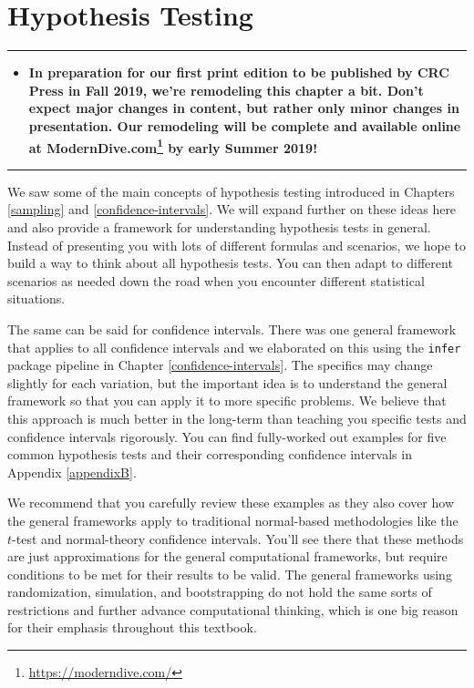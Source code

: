 \documentclass[12pt, krantz2,]{krantz}
\renewcommand{\href}[2]{#2\footnote{\url{#1}}}
\newenvironment{rmdblock}[1]
  {\begin{shaded*}
  \begin{itemize}
  \renewcommand{\labelitemi}{
    \raisebox{-.7\height}[0pt][0pt]{
    }
  }
  \item
  }
  {
  \end{itemize}
  \end{shaded*}
  }
\newenvironment{announcement}
  {\begin{rmdblock}{warning}}
  {\end{rmdblock}}
\begin{document}
\hypertarget{hypothesis-testing}{%
\chapter{Hypothesis Testing}\label{hypothesis-testing}}

\begin{center}\rule{0.5\linewidth}{\linethickness}\end{center}

\begin{announcement}
\textbf{In preparation for our first print edition to be published by
CRC Press in Fall 2019, we're remodeling this chapter a bit. Don't
expect major changes in content, but rather only minor changes in
presentation. Our remodeling will be complete and available online at
\href{https://moderndive.com/}{ModernDive.com} by early Summer 2019!}
\end{announcement}

\begin{center}\rule{0.5\linewidth}{\linethickness}\end{center}

We saw some of the main concepts of hypothesis testing introduced in Chapters \ref{sampling} and \ref{confidence-intervals}. We will expand further on these ideas here and also provide a framework for understanding hypothesis tests in general. Instead of presenting you with lots of different formulas and scenarios, we hope to build a way to think about all hypothesis tests. You can then adapt to different scenarios as needed down the road when you encounter different statistical situations.

The same can be said for confidence intervals. There was one general framework that applies to all confidence intervals and we elaborated on this using the \texttt{infer} package pipeline in Chapter \ref{confidence-intervals}. The specifics may change slightly for each variation, but the important idea is to understand the general framework so that you can apply it to more specific problems. We believe that this approach is much better in the long-term than teaching you specific tests and confidence intervals rigorously. You can find fully-worked out examples for five common hypothesis tests and their corresponding confidence intervals in Appendix \ref{appendixB}.

We recommend that you carefully review these examples as they also cover how the general frameworks apply to traditional normal-based methodologies like the \(t\)-test and normal-theory confidence intervals. You'll see there that these methods are just approximations for the general computational frameworks, but require conditions to be met for their results to be valid. The general frameworks using randomization, simulation, and bootstrapping do not hold the same sorts of restrictions and further advance computational thinking, which is one big reason for their emphasis throughout this textbook.
\end{document}

